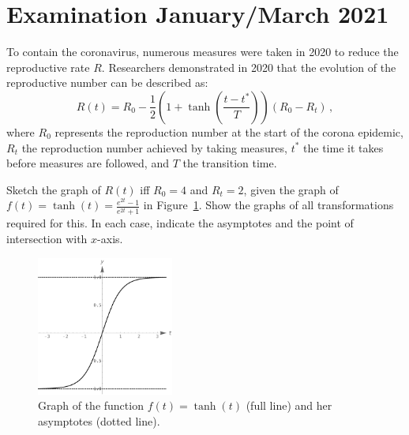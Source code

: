 \section{Examination January/March 2021}
\begin{Exercise}[label=synthese_3] To contain the coronavirus, numerous measures were taken in 2020 to reduce the reproductive rate $R$. Researchers demonstrated in 2020 that the evolution of the reproductive number can be described as:
$$
R(t)=R_0-\dfrac{1}{2}\left(1+\tanh\left(\dfrac{t-t^*}{T}\right)\right)\left(R_0-R_t\right)\,,
$$
where $R_0$ represents the reproduction number at the start of the corona epidemic, $R_t$ the reproduction number achieved by taking measures, $t^*$ the time it takes before measures are followed, and $T$ the transition time. 

Sketch the graph of $R(t)$ iff $R_0=4$ and $R_t=2$, given the graph of $f(t)=\tanh(t)=\frac{e^{2t}-1}{e^{2t}+1}$ in Figure~\ref{Tanh}. Show the graphs of all transformations required for this. In each case, indicate the asymptotes and the point of intersection with $x$-axis. 
	 \begin{figure}[H]
		\centering
		\centerline{
			\includegraphics[width=0.4\textwidth]{Tanh.pdf}
		}
		\caption{Graph of the function $f(t)=\tanh(t)$ (full line) and her asymptotes (dotted line).}
		\label{Tanh}
	\end{figure}
\end{Exercise}


